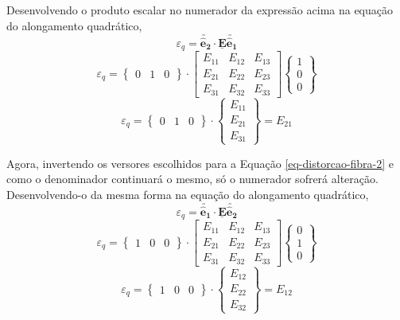 	Desenvolvendo o produto escalar no numerador da expressão acima na equação do alongamento quadrático,
	\[\varepsilon_q=\utilde{\mathbf{\hat{e}_2}}\cdot\underline{\mathbf{E}}\utilde{\mathbf{\hat{e}_1}}\]
	\[
	\varepsilon_q
	=
	\begin{Bmatrix}
	0 & 1 & 0
	\end{Bmatrix}
	\cdot
	\begin{bmatrix}
	E_{11} & E_{12} & E_{13} \\
	E_{21} & E_{22} & E_{23} \\
	E_{31} & E_{32} & E_{33}
	\end{bmatrix}
	\begin{Bmatrix}
	1 \\ 0 \\ 0
	\end{Bmatrix}
	\]
	\[
	\varepsilon_q
	=
	\begin{Bmatrix}
	0 & 1 & 0
	\end{Bmatrix}
	\cdot
	\begin{Bmatrix}
	E_{11} \\ E_{21} \\ E_{31}
	\end{Bmatrix}
	=
	E_{21}	
	\]
	
	Agora, invertendo os versores escolhidos para a Equação \eqref{eq-distorcao-fibra-2} e como o denominador continuará o mesmo, só o numerador sofrerá alteração. Desenvolvendo-o da mesma forma na equação do alongamento quadrático,
	\[\varepsilon_q=\utilde{\mathbf{\hat{e}_1}}\cdot\underline{\mathbf{E}}\utilde{\mathbf{\hat{e}_2}}\]
	\[
	\varepsilon_q
	=
	\begin{Bmatrix}
	1 & 0 & 0
	\end{Bmatrix}
	\cdot
	\begin{bmatrix}
	E_{11} & E_{12} & E_{13} \\
	E_{21} & E_{22} & E_{23} \\
	E_{31} & E_{32} & E_{33}
	\end{bmatrix}
	\begin{Bmatrix}
	0 \\ 1 \\ 0
	\end{Bmatrix}
	\]
	\[
	\varepsilon_q
	=
	\begin{Bmatrix}
	1 & 0 & 0
	\end{Bmatrix}
	\cdot
	\begin{Bmatrix}
	E_{12} \\ E_{22} \\ E_{32}
	\end{Bmatrix}
	=
	E_{12}
	\]
	
